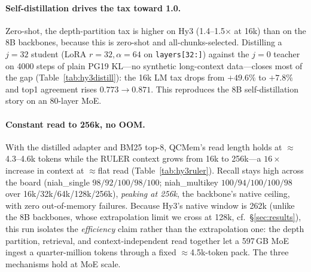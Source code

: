 \paragraph{Self-distillation drives the tax toward 1.0.} Zero-shot, the
depth-partition tax is higher on Hy3 (1.4--1.5$\times$ at 16k) than on the 8B
backbones, because this is zero-shot and all-chunks-selected. Distilling a
$j{=}32$ student (LoRA $r{=}32,\alpha{=}64$ on \texttt{layers[32:]}) against the
$j{=}0$ teacher on 4000 steps of plain PG19 KL---no synthetic long-context
data---closes most of the gap (Table~\ref{tab:hy3distill}): the 16k LM tax drops
from $+49.6\%$ to $+7.8\%$ and top1 agreement rises $0.773\to0.871$. This
reproduces the 8B self-distillation story on an $80$-layer MoE.



\paragraph{Constant read to 256k, no OOM.} With the distilled adapter and BM25
top-8, QCMem's read length holds at $\approx$4.3--4.6k tokens while the RULER
context grows from 16k to 256k---a $16\times$ increase in context at
$\approx$flat read (Table~\ref{tab:hy3ruler}). Recall stays high across the
board (niah\_single $98/92/100/98/100$; niah\_multikey $100/94/100/100/98$ over
16k/32k/64k/128k/256k), \emph{peaking at 256k}, the backbone's native ceiling,
with zero out-of-memory failures. Because Hy3's native window is 262k (unlike
the 8B backbones, whose extrapolation limit we cross at 128k, cf.\
\S\ref{sec:results}), this run isolates the \emph{efficiency} claim rather than
the extrapolation one: the depth partition, retrieval, and context-independent
read together let a 597\,GB MoE ingest a quarter-million tokens through a fixed
$\approx$4.5k-token pack. The three mechanisms hold at MoE scale.


